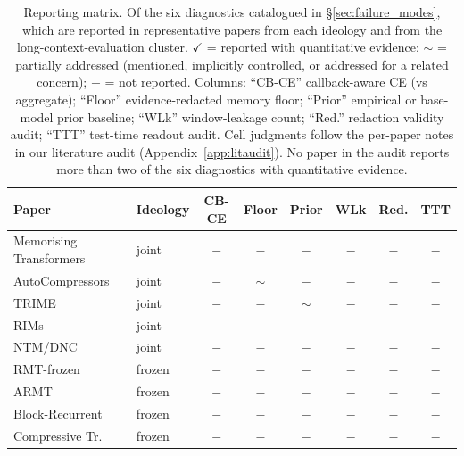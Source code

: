\documentclass{article}
\begin{document}
\begin{table}[t]
\centering
\caption{Reporting matrix.  Of the six diagnostics catalogued in
\S\ref{sec:failure_modes}, which are reported in representative
papers from each ideology and from the long-context-evaluation
cluster.  $\checkmark$ = reported with quantitative evidence;
$\sim$ = partially addressed (mentioned, implicitly controlled, or
addressed for a related concern); $-$ = not reported.  Columns:
``CB-CE'' callback-aware CE (vs aggregate); ``Floor''
evidence-redacted memory floor; ``Prior'' empirical or base-model
prior baseline; ``WLk'' window-leakage count; ``Red.'' redaction
validity audit; ``TTT'' test-time readout audit.  Cell judgments
follow the per-paper notes in our literature audit
(Appendix~\ref{app:litaudit}).  No paper in the audit reports more
than two of the six diagnostics with quantitative evidence.}
\label{tab:ideologies}
\small
\begin{tabular}{llcccccc}
\toprule
Paper & Ideology & CB-CE & Floor & Prior & WLk & Red. & TTT \\
\midrule
Memorising Transformers~\cite{memorizing2022}     & joint     & $-$    & $-$    & $-$           & $-$           & $-$ & $-$    \\
AutoCompressors~\cite{autocompressors2023}        & joint     & $-$    & $\sim$ & $-$           & $-$           & $-$ & $-$    \\
TRIME~\cite{trime2022}                             & joint     & $-$    & $-$    & $\sim$        & $-$           & $-$ & $-$    \\
RIMs~\cite{rims2021}                               & joint     & $-$    & $-$    & $-$           & $-$           & $-$ & $-$    \\
NTM/DNC~\cite{ntm2014}                             & joint     & $-$    & $-$    & $-$           & $-$           & $-$ & $-$    \\
RMT-frozen~\cite{rmt2022}                          & frozen    & $-$    & $-$    & $-$           & $-$           & $-$ & $-$    \\
ARMT~\cite{armt2024}                               & frozen    & $-$    & $-$    & $-$           & $-$           & $-$ & $-$    \\
Block-Recurrent~\cite{blockrecurrent2022}         & frozen    & $-$    & $-$    & $-$           & $-$           & $-$ & $-$    \\
Compressive Tr.~\cite{compressive2019}             & frozen    & $-$    & $-$    & $-$           & $-$           & $-$ & $-$    \\

\end{tabular}
\end{table}
\end{document}
